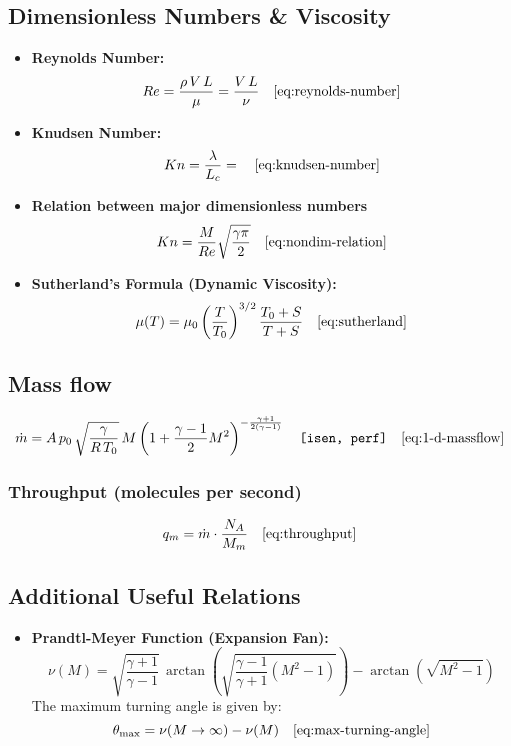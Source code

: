 \subsection*{Dimensionless Numbers \& Viscosity}
\begin{itemize}
    \item \textbf{Reynolds Number:}  
    $$
	    Re = \frac{\rho\,V\,L}{\mu} = \frac{V\,L}{\nu} \quad \eqref{eq:reynolds-number}
    $$
    \item \textbf{Knudsen Number:}  
    $$
	    Kn = \frac{\lambda}{L_c} = \quad \eqref{eq:knudsen-number}
    $$
	\item \textbf{Relation between major dimensionless numbers}
	$$
		Kn = \frac{M}{Re}\sqrt{\frac{\gamma \pi}{2}} \quad \eqref{eq:nondim-relation}
	$$
    \item \textbf{Sutherland’s Formula (Dynamic Viscosity):}  
    $$
	    \mu(T) = \mu_0\left(\frac{T}{T_0}\right)^{3/2}\frac{T_0+S}{T+S} \quad \eqref{eq:sutherland}
    $$
\end{itemize}

\subsection*{Mass flow}
$$
	\dot{m} = A\,p_0\,\sqrt{\frac{\gamma}{R\,T_0}}\,M\left(1+\frac{\gamma-1}{2}M^2\right)^{-\frac{\gamma+1}{2(\gamma-1)}} \quad \texttt{[isen, perf]} \quad \eqref{eq:1-d-massflow}
$$

\subsubsection*{Throughput (molecules per second)}
$$
	q_m = \dot{m} \cdot \frac{N_A}{M_m} \quad \eqref{eq:throughput}
$$

\subsection*{Additional Useful Relations}
\begin{itemize}
    \item \textbf{Prandtl-Meyer Function (Expansion Fan):}  
    $$
    \nu(M) = \sqrt{\frac{\gamma+1}{\gamma-1}}\,\arctan\!\left(\sqrt{\frac{\gamma-1}{\gamma+1}(M^2-1)}\right) - \arctan\!\left(\sqrt{M^2-1}\right)
    $$
    The maximum turning angle is given by:
    $$
	    \theta_{\text{max}} = \nu(M\to\infty) - \nu(M) \quad \eqref{eq:max-turning-angle}
    $$
\end{itemize}
